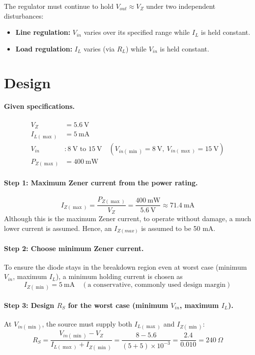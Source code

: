 The regulator must continue to hold $V_{out} \approx V_Z$ under two independent
disturbances:
\begin{itemize}
	\item \textbf{Line regulation:} $V_{in}$ varies over its specified range while $I_L$ is held constant.
	\item \textbf{Load regulation:} $I_L$ varies (via $R_L$) while $V_{in}$ is held constant.
\end{itemize}

\section{Design}

\paragraph{Given specifications.}
\begin{align*}
	V_Z &= 5.6\ \text{V} \\
	I_{L(\max)} &= 5\ \text{mA} \\
	V_{in} &: 8\ \text{V to } 15\ \text{V} \quad (V_{in(\min)} = 8\ \text{V},\ V_{in(\max)} = 15\ \text{V}) \\
	P_{Z(\max)} &= 400\ \text{mW}
\end{align*}

\paragraph{Step 1: Maximum Zener current from the power rating.}
\[
I_{Z(\max)} = \frac{P_{Z(\max)}}{V_Z} = \frac{400\ \text{mW}}{5.6\ \text{V}} \approx 71.4\ \text{mA}
\]
Although this is the maximum Zener current, to operate without damage, a much lower current is assumed. Hence, an $I_{Z(max)}$ is assumed to be 50 mA.
\paragraph{Step 2: Choose minimum Zener current.}
To ensure the diode stays in the breakdown region even at worst case
(minimum $V_{in}$, maximum $I_L$), a minimum holding current is chosen as
\[
I_{Z(\min)} = 5\ \text{mA} \quad (\text{a conservative, commonly used design margin})
\]

\paragraph{Step 3: Design $R_S$ for the worst case (minimum $V_{in}$, maximum $I_L$).}
At $V_{in(\min)}$, the source must supply both $I_{L(\max)}$ and $I_{Z(\min)}$:
\[
R_S = \frac{V_{in(\min)} - V_Z}{I_{L(\max)} + I_{Z(\min)}}
= \frac{8 - 5.6}{(5 + 5)\times 10^{-3}}
= \frac{2.4}{0.010} = 240\ \Omega
\]

